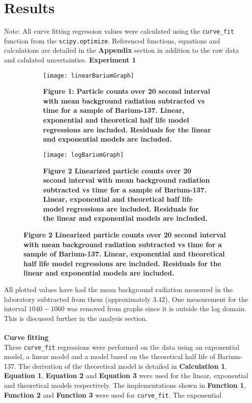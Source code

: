 \documentclass[
	letterpaper, %
	10pt, %
]{CSUniSchoolLabReport}
\begin{document}
\section{Results}
\vspace{20pt}
Note: All curve fitting regression values were calculated using the \lstinline{curve_fit} function from the \lstinline{scipy.optimize}. Referenced functions, equations and calculations are detailed in the \textbf{Appendix} section in addition to the raw data and calulated uncertainties.
\newpage
{\Large\textbf{Experiment 1}}
\begin{figure}[H]
	\begin{subfigure}{0.45\textwidth}
		\texttt{[image: linearBariumGraph]}
		\caption{\textbf{Figure 1: Particle counts over 20 second interval with mean background radiation subtracted vs time for a sample of Barium-137. Linear, exponential and theoretical half life model regressions are included. Residuals for the linear and exponential models are included.}}
	\end{subfigure}
	\quad
	\begin{subfigure}{0.45\textwidth}
		\texttt{[image: logBariumGraph]}
		\caption{\textbf{Figure 2 Linearized particle counts over 20 second interval with mean background radiation subtracted vs time for a sample of Barium-137.  Linear, exponential and theoretical half life model regressions are included. Residuals for the linear and exponential models are included.}}
	\end{subfigure}
\end{figure}
All plotted values have had the mean background radiation measured in the laboratory subtracted from
them (approximately $3.42$). One measurement for the interval $1040-1060$ was removed from graphs since
it is outside the log domain. This is discussed further in the analysis section.\\\\
{\large\textbf{Curve fitting}}\\
Three \lstinline{curve_fit} regressions were performed on the data using an exponential model, a linear model and a
model based on the theoretical half life of Barium-137. The derivation of the theoretical model is detailed in
\textbf{Calculation 1}. \textbf{Equation 1}, \textbf{Equation 2} and \textbf{Equation 3} were used for the linear, exponential and
theoretical models respectively. The implementations shown in \textbf{Function 1}, \textbf{Function 2} and \textbf{Function 3} were used for \lstinline{curve_fit}. The exponential
\end{document}
